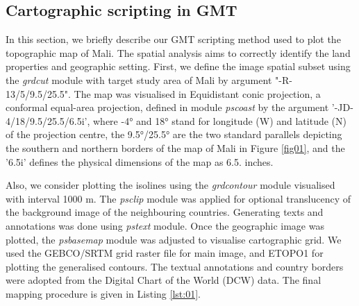 \documentclass[12pt,a4paper,oneside]{article}
\def \newpar{\vspace{6pt}}
\begin{document}
\subsection*{Cartographic scripting in GMT}

\newpar In this section, we briefly describe our GMT scripting method used to plot the topographic map of Mali. The spatial analysis aims to correctly identify the land properties and geographic setting. First, we define the image spatial subset using the \emph{grdcut} module with target study area of Mali by argument "-R-13/5/9.5/25.5". The map was visualised in Equidistant conic projection, a conformal equal-area projection, defined in module \emph{pscoast} by the argument '-JD-4/18/9.5/25.5/6.5i', where -4° and 18° stand for longitude (W) and latitude (N) of the projection centre, the 9.5°/25.5° are the two standard parallels depicting the southern and northern borders of the map of Mali in Figure \ref{fig01}, and the '6.5i' defines the physical dimensions of the map as 6.5. inches. 

\newpar Also, we consider plotting the isolines using the \emph{grdcontour} module visualised with interval 1000 m. The \emph{psclip} module was applied for optional translucency of the background image of the neighbouring countries. Generating texts and annotations was done using \emph{pstext} module. Once the geographic image was plotted, the \emph{psbasemap} module was adjusted to visualise cartographic grid. We used the GEBCO/SRTM grid raster file for main image, and ETOPO1 for plotting the generalised contours. The textual annotations and country borders were adopted from the Digital Chart of the World (DCW) data. The final mapping procedure is given in Listing \ref{lst:01}.
\end{document}
